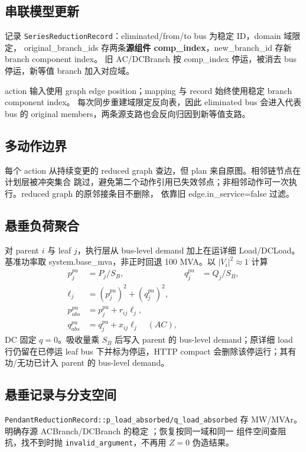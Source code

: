 \subsection{串联模型更新}

记录 \texttt{SeriesReductionRecord}：eliminated/from/to bus 为稳定 ID，domain 域限定，
original\_branch\_ids 存两条\textbf{源组件 comp\_index}，new\_branch\_id 存新 branch component index。
旧 AC/DCBranch 按 comp\_index 停运，被消去 bus 停运，新等值 branch 加入对应域。

action 输入使用 graph edge position；mapping 与 record 始终使用稳定 branch component index。
 每次同步重建域限定反向表，因此 eliminated bus
会进入代表 bus 的 original members，两条源支路也会反向归因到新等值支路。

\subsection{多动作边界}

每个 action 从持续变更的 reduced graph 查边，但 plan 来自原图。相邻链节点在计划层被冲突集合
跳过，避免第二个动作引用已失效邻点；非相邻动作可一次执行。reduced graph 的原邻接条目不删除，
依靠旧 edge.in\_service=false 过滤。

\subsection{悬垂负荷聚合}

对 parent $i$ 与 leaf $j$，执行层从 bus-level demand 加上在运详细 Load/DCLoad。基准功率取
system.base\_mva，非正时回退 100 MVA。以 $|V_i|^2\approx1$ 计算
\begin{align}
p_j^{pu}&=P_j/S_B,&q_j^{pu}&=Q_j/S_B,\\
\ell_j&=(p_j^{pu})^2+(q_j^{pu})^2,\\
p_{abs}^{pu}&=p_j^{pu}+r_{ij}\ell_j,\\
q_{abs}^{pu}&=q_j^{pu}+x_{ij}\ell_j \quad(AC),
\end{align}
DC 固定 $q=0$。吸收量乘 $S_B$ 后写入 parent 的 bus-level demand；原详细 load 行仍留在已停运
leaf bus 下并标为停运，HTTP compact 会删除该停运行；其有功/无功已计入 parent 的 bus-level demand。

\subsection{悬垂记录与分支空间}

\texttt{PendantReductionRecord::p\_load\_absorbed/q\_load\_absorbed} 存 MW/MVAr。
 明确存源 ACBranch/DCBranch 的稳定 ；恢复按同一域和同一
组件空间查阻抗，找不到时抛 \texttt{invalid\_argument}，不再用 $Z=0$ 伪造结果。

